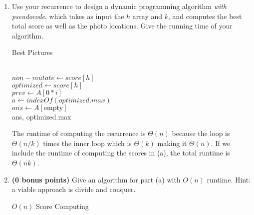 \documentclass[11pt]{article}
\theoremstyle{definition}
\theoremstyle{theorem}
\begin{document}
\begin{enumerate}[label={\bf (\alph*)}]
 \newpage
	\item Use your recurrence to design a dynamic programming algorithm {\em with pseudocode}, which takes as input the $h$ array and $k$, and computes the best total score as well as the photo locations. Give the running time of your algorithm. \\
\begin{algorithm}[H]
\caption{Best Pictures}
 { \\
$non-mutate \gets score[h]$ \\
$optimized \gets score[h]$ \\
$prev \gets A[0*i]$ \\
    $a \gets indexOf(optimized.max)$ \\
    $ans \gets A[\text{empty}]$ \\
    \Return ans, optimized.max
}
\end{algorithm}

	The runtime of computing the recurrence is $\Theta(n)$ because the loop is $\Theta(n/k)$ times the inner loop which is $\Theta(k)$ making it $\Theta(n)$. If we include the runtime of computing the scores in (a), the total runtime is $\Theta(nk)$.
	
	\item {\bf (0 bonus points)} Give an algorithm for part (a) with $O(n)$ runtime. Hint: a viable approach is divide and conquer. \\
\begin{algorithm}[H]
\caption{$O(n)$ Score Computing}
\end{algorithm}

 
\end{enumerate}
\newpage
\end{document}
